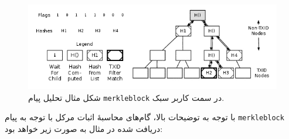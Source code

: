 \begin{figure}
	\centering
	\includegraphics[width=\linewidth]{image/merkleblock-parsing}
	\caption{شکل مثال تحلیل پیام \texttt{merkleblock} در سمت کاربر سبک.\cite{P2P_ref}}
	\label{fig:merkleblock-parsing}
\end{figure}

با توجه به توضیحات بالا، گام‌های محاسبهٔ اثبات مرکل با توجه به پیام \texttt{merkleblock} دریافت شده در مثال به صورت زیر خواهد بود:

